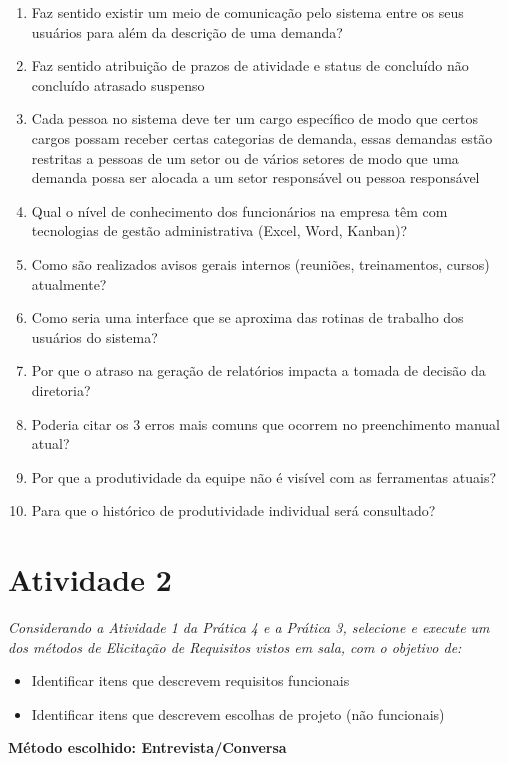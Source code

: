 \documentclass[12pt,a4paper]{article}
\begin{document}
\begin{enumerate}
    \item Faz sentido existir um meio de comunicação pelo sistema entre os seus usuários para além da descrição de uma demanda?
    \item Faz sentido atribuição de prazos de atividade e status de concluído não concluído atrasado suspenso
    \item Cada pessoa no sistema deve ter um cargo específico de modo que certos cargos possam receber certas categorias de demanda, essas demandas estão restritas a pessoas de um setor ou de vários setores de modo que uma demanda possa ser alocada a um setor responsável ou pessoa responsável
    \item Qual o nível de conhecimento dos funcionários na empresa têm com tecnologias de gestão administrativa (Excel, Word, Kanban)?
    \item Como são realizados avisos gerais internos (reuniões, treinamentos, cursos) atualmente?
    \item Como seria uma interface que se aproxima das rotinas de trabalho dos usuários do sistema?
    \item Por que o atraso na geração de relatórios impacta a tomada de decisão da diretoria?
    \item Poderia citar os 3 erros mais comuns que ocorrem no preenchimento manual atual?
    \item Por que a produtividade da equipe não é visível com as ferramentas atuais?
    \item Para que o histórico de produtividade individual será consultado?

\end{enumerate}

\section*{Atividade 2}
\textit{Considerando a Atividade 1 da Prática 4 e a Prática 3, selecione e execute um dos métodos de Elicitação de Requisitos vistos em sala, com o objetivo de:}

\begin{itemize}[before=\itshape]
    \item Identificar itens que descrevem requisitos funcionais
    \item Identificar itens que descrevem escolhas de projeto (não funcionais)
\end{itemize}

\textbf{Método escolhido: Entrevista/Conversa}
\end{document}
